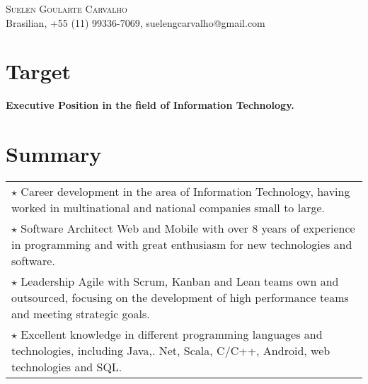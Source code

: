 \documentclass[a4paper, oneside, final]{scrartcl}
\newcommand{\vspc}{\vspace{0.15cm}} %
\begin{document}
\begin{center}
\textsc{\Huge{Suelen Goularte Carvalho}} \vspc\\
{\small Brasilian, +55 (11) 99336-7069, suelengcarvalho@gmail.com} 


\section{Target}
	{\large \bf Executive Position in the field of Information Technology.}



\section{Summary}
\begin{tabularx}{1\linewidth}{X}
	$\star$ Career development in the area of Information Technology, having worked in multinational and national companies small to large. \vspc\\

	$\star$ Software Architect Web and Mobile with over 8 years of experience in programming and with great enthusiasm for new technologies and software. \vspc\\
		
	$\star$ Leadership Agile with Scrum, Kanban and Lean teams own and outsourced, focusing on the development of high performance teams and meeting strategic goals. \vspc\\
	
	$\star$ Excellent knowledge in different programming languages and technologies, including Java,. Net, Scala, C/C++, Android, web technologies and SQL. \vspc\\
\end{tabularx}



\end{center}
\end{document}

